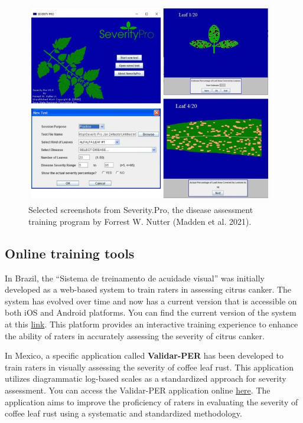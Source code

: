 \documentclass[
  letterpaper,
]{book}
\begin{document}
\begin{figure}

\includegraphics[width=4.28125in,height=\textheight]{imgs/severitypro.png} \hfill{}

\caption{\label{fig-severitypro}Selected screenshots from Severity.Pro,
the disease assessment training program by Forrest W. Nutter (Madden et
al. 2021).}

\end{figure}

\hypertarget{online-training-tools}{%
\subsection{Online training tools}\label{online-training-tools}}

In Brazil, the ``Sistema de treinamento de acuidade visual'' was
initially developed as a web-based system to train raters in assessing
citrus canker. The system has evolved over time and now has a current
version that is accessible on both iOS and Android platforms. You can
find the current version of the system at this
\href{http://sitav.pga.uem.br/index.php?menu=app}{link}. This platform
provides an interactive training experience to enhance the ability of
raters in accurately assessing the severity of citrus canker.

In Mexico, a specific application called \textbf{Validar-PER} has been
developed to train raters in visually assessing the severity of coffee
leaf rust. This application utilizes diagrammatic log-based scales as a
standardized approach for severity assessment. You can access the
Validar-PER application online
\href{http://royacafe.lanref.org.mx/ValidarPer/app/index.php}{here}. The
application aims to improve the proficiency of raters in evaluating the
severity of coffee leaf rust using a systematic and standardized
methodology.
\end{document}
